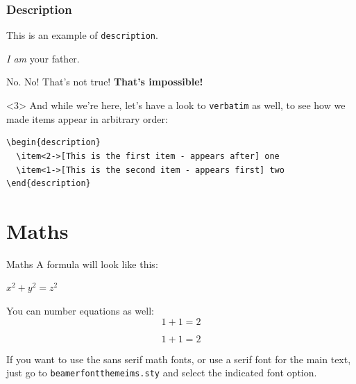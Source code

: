 \documentclass[usenames,dvipsnames,10pt,aspectratio=169]{beamer}
\begin{document}
\begin{frame}[fragile]
\frametitle{Description}
This is an example of \texttt{description}.

\begin{description}
\item<2->[Vader] \emph{I am} your father.
\item<1->[Luke] No. No! That's not true! \textbf{That's impossible!}
\end{description}

\begin{uncoverenv}<3>
  \vskip 0.5cm
  And while we're here, let's have a look to \texttt{verbatim} as well, to see how we made items appear in arbitrary order:
  \vskip 0.5cm
  \begin{verbatim}
\begin{description}
  \item<2->[This is the first item - appears after] one
  \item<1->[This is the second item - appears first] two
\end{description}
  \end{verbatim}
\end{uncoverenv}

\end{frame}

\section{Maths}

\begin{frame}{Maths}
A formula will look like this: 
\begin{center}
 $x^2 + y^2 = z^2$
\end{center}

You can number equations as well:
\begin{equation}
1+1=2
\end{equation}

\begin{equation}
1+1=2 \tag{custom label!}
\end{equation}

\vskip 0.5cm

If you want to use the sans serif math fonts, or use a serif font for the main text, just go to \texttt{beamerfontthemeims.sty} and select the indicated font option. 

\end{frame}
\end{document}
